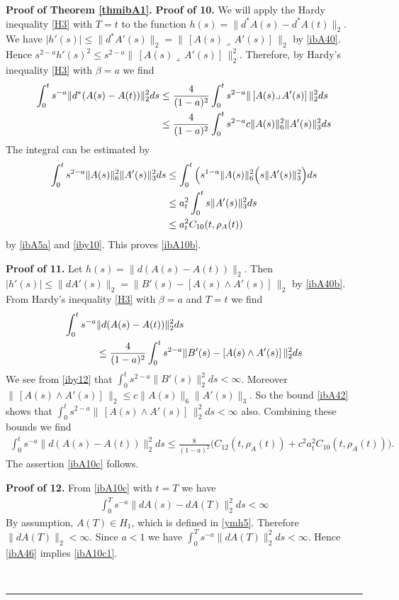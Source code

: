 \documentclass[12pt]{article}
\newenvironment{proof}[1][Proof]{\textbf{#1.} }{\ \rule{0.5em}{0.5em}}
\def \({\Big(}
\def \){\Big)}
\def \eref{\eqref}
\def \lrc{\lrcorner\,}
\numberwithin{equation}{section}
\begin{document}
\begin{proof}[Proof of Theorem \ref{thmibA1}]
\bigskip
\noindent
{\bf  Proof of  10.} 
 We will apply the Hardy inequality \eref{H3}  with $T= t$  
  to the function $h(s) = \|d^*A(s) - d^*A(t)\|_2$. 
 We have $|h'(s)| \le \| d^*A'(s)\|_2 = \|\, [A(s)\lrc A'(s)]\, \|_2$ by \eref{ibA40}.   
 Hence  $s^{2-a} h'(s)^2 \le s^{2-a} \|\, [A(s)\lrc A'(s)]\, \|_2^2$. Therefore, by Hardy's inequality \eref{H3}
with $\beta = a$ we find
\begin{align}
\int_0^t s^{-a}\|d^*(A(s) - A(t))\|_2^2 ds 
&\le  \frac{4}{(1-a)^2} \int_0^t  s^{2-a}  \|\, [A(s)\lrc A'(s)]\, \|_2^2 ds\notag\\
&\le    \frac{4}{(1-a)^2} \int_0^t  s^{2-a} c \|A(s)\|_6^2\|A'(s)\|_3^2 ds \notag
\end{align}
The integral can be estimated by
\begin{align}
 \int_0^t  s^{2-a}  \|A(s)\|_6^2\|A'(s)\|_3^2 ds & \le \int_0^t \Big(s^{1-a} \|A(s)\|_6^2 \(s\|A'(s)\|_3^2\) ds \notag\\
 &\le a_t^2 \int_0^t  s\|A'(s)\|_3^2 ds \notag\\
 &\le a_t^2  C_{10}(t, \rho_A(t))                           \label{ibA42}
\end{align}
by \eref{ibA5a} and \eref{iby10}.  This proves  \eref{ibA10b}.


\bigskip
\noindent
 {\bf Proof of 11.}   
 Let $h(s) = \|d(A(s) - A(t))\|_2$. Then $|h'(s)| \le \| dA'(s)\|_2 = \| B'(s) - [A(s)\wedge A'(s)]\, \|_2$
by \eref{ibA40b}.
From Hardy's inequality \eref{H3} with $\beta = a$  and $T =t$ we find
\begin{align}
\int_0^t s^{-a} &\| d(A(s) - A(t)) \|_2^2 ds  \notag\\
&\le \frac{4}{(1-a)^2}\int_0^t s^{2-a}\| B'(s) - [A(s)\wedge A'(s)]\, \|_2^2 ds       \label{ibA43}
\end{align}
We see from \eref{iby12} that $\int_0^t s^{2-a} \| B'(s)\|_2^2 ds < \infty$.
Moreover $\|\, [A(s)\wedge A'(s)]\, \|_2 \le c \|A(s)\|_6 \| A'(s)\|_3$. So the bound \eref{ibA42} shows
that $\int_0^t s^{2-a} \|\, [A(s)\wedge A'(s)]\, \|_2^2  ds < \infty$ also.  Combining these bounds we find
\begin{align}
\int_0^t s^{-a} \| d(A(s) - A(t)) \|_2^2 ds  
      \le \frac{8}{(1-a)^2}\(C_{12}(t, \rho_A(t)) + c^2a_t^2  C_{10}(t, \rho_A(t))\).  \label{ibA45}
\end{align}
The assertion \eref{ibA10c} follows. 



\bigskip
\noindent
{\bf Proof of 12.} 
 From \eref{ibA10c} with $t = T$ we have
\begin{align}
\int_0^T s^{-a}\|dA(s) - dA(T)\|_2^2 ds < \infty               \label{ibA46}
\end{align}
By assumption, $A(T) \in H_1$, which is defined in \eref{ymh5}.
Therefore $\|dA(T)\|_2 < \infty$.  Since $a < 1$ we have $\int_0^T s^{-a}\|dA(T)\|_2^2 ds < \infty$.
Hence   \eref{ibA46} implies \eref{ibA10c1}.





\end{proof}
\end{document}
